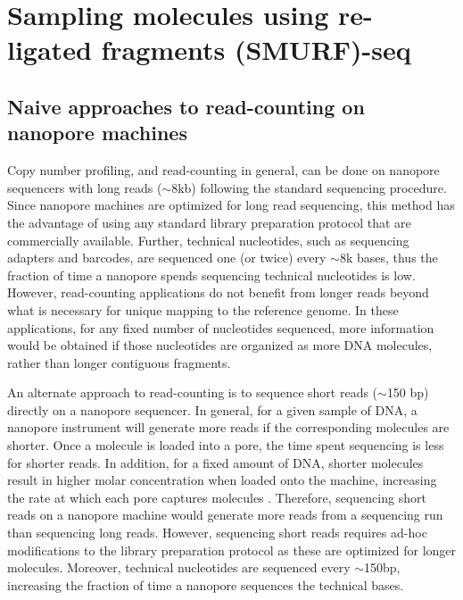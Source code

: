 \chapter{Sampling molecules using re-ligated fragments (SMURF)-seq}
\label{ch3}


\section{Naive approaches to read-counting on nanopore machines}
Copy number profiling, and read-counting in general, can be done on
nanopore sequencers with long reads ($\sim$8kb) following the standard
sequencing procedure.
Since nanopore machines are optimized for long read sequencing, this
method has the advantage of using any standard library preparation
protocol that are commercially available. Further, technical nucleotides,
such as sequencing adapters and barcodes, are sequenced one (or twice)
every $\sim$8k bases, thus the fraction of time a nanopore spends
sequencing technical nucleotides is low.
However, read-counting applications do not benefit from longer reads
beyond what is necessary for unique mapping to the reference genome. In
these applications, for any fixed number of nucleotides sequenced, more
information would be obtained if those nucleotides are organized as more
DNA molecules, rather than longer contiguous fragments.

An alternate approach to read-counting is to sequence short reads
($\sim$150 bp) directly on a nanopore sequencer.
In general, for a given sample of DNA, a nanopore instrument will
generate more reads if the corresponding molecules are shorter.  Once a
molecule is loaded into a pore, the time spent sequencing is less for
shorter reads. In addition, for a fixed amount of DNA, shorter molecules
result in higher molar concentration when loaded onto the machine,
increasing the rate at which each pore captures molecules
\citep{muthukumar2010theory,wanunu2008dna}. Therefore, sequencing short
reads on a nanopore machine would generate more reads from a sequencing
run than sequencing long reads.
However, sequencing short reads requires ad-hoc modifications to the
library preparation protocol as these are optimized for longer molecules.
Moreover, technical nucleotides are sequenced every $\sim$150bp,
increasing the fraction of time a nanopore sequences the technical
bases.

